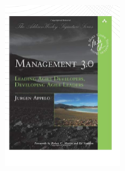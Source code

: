 \documentclass[    
  12pt, 
  compress,
  aspectratio=169,
  blue
  ]{beamer}
\begin{document}
\begin{frame}
\begin{columns}[c]
\begin{columns}[c]
\end{columns}

\centering
\begin{figure}
\includegraphics[scale=0.3]{metodoloia3}
\end{figure}
\end{columns}
\end{frame}
\end{document}

